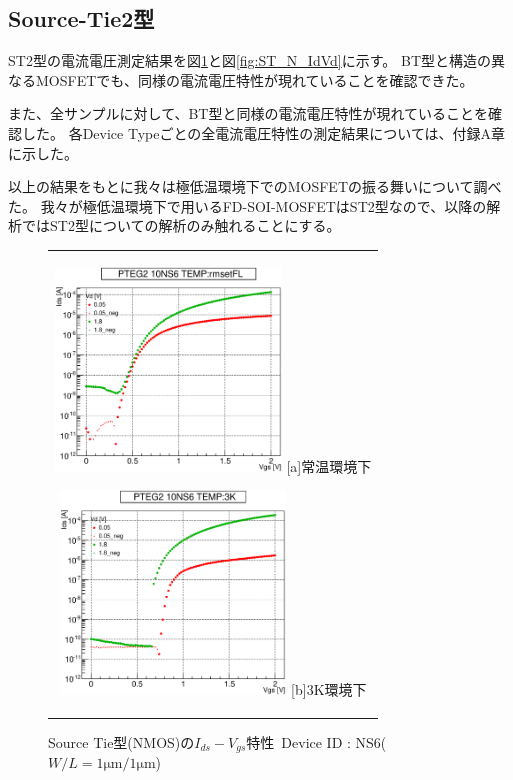 		\subsection{Source-Tie2型}
		ST2型の電流電圧測定結果を図\ref{fig:ST_N_IdVg}と図\ref{fig:ST_N_IdVd}に示す。
		BT型と構造の異なるMOSFETでも、同様の電流電圧特性が現れていることを確認できた。
		
		また、全サンプルに対して、BT型と同様の電流電圧特性が現れていることを確認した。
		各Device Typeごとの全電流電圧特性の測定結果については、付録A章に示した。
		
		以上の結果をもとに我々は極低温環境下でのMOSFETの振る舞いについて調べた。
		我々が極低温環境下で用いるFD-SOI-MOSFETはST2型なので、以降の解析ではST2型についての解析のみ触れることにする。
			\begin{figure}[htbp]
				\begin{center}
					\begin{tabular}{c}
						\begin{minipage}{0.5\hsize}
							\begin{center}
								\includegraphics[clip, width=6cm]{./Chapter/Appendix/Picture/NST/NS6/PTEG2_10_NS6_IdVg_rmsetFL.eps}
								\hspace{1.6cm} [a]常温環境下
							\end{center}
						\end{minipage}
						\begin{minipage}{0.5\hsize}
							\begin{center}
								\includegraphics[clip, width=6cm]{./Chapter/Appendix/Picture/NST/NS6/PTEG2_10_NS6_IdVg_3K.eps}
								\hspace{1.6cm} [b]3K環境下
							\end{center}
						\end{minipage}
					\end{tabular}
					\caption{Source Tie型(NMOS)の$I_{ds}-V_{gs}$特性\ Device ID : NS6($W/L = 1\mathrm{\mu m} / 1\mathrm{\mu m}$)}
					\label{fig:ST_N_IdVg}
				\end{center}
			\end{figure}

